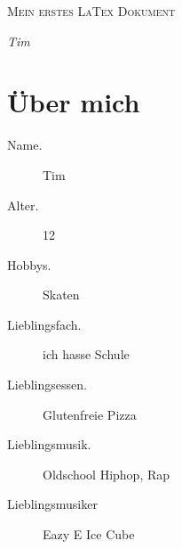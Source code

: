 \documentclass[12pt, a4paper]{article} %
\begin{document}

\thispagestyle{empty}

\begin{title}
	
	\vspace{5cm}
	
	{\scshape\Huge Mein erstes LaTex Dokument \par}

	\vspace{5cm}
	{\Large\itshape Tim \par} %
	

\end{title}

\newpage

\tableofcontents %

\newpage

\section{\"Uber mich}

\begin{description}
\item[Name.]
Tim %
\item[Alter.] 
12 
\item[Hobbys.]
Skaten
\item[Lieblingsfach.]
ich hasse Schule
\item[Lieblingsessen.]
Glutenfreie Pizza
\item[Lieblingsmusik.]
Oldschool Hiphop, Rap 
\item[Lieblingsmusiker] %
Eazy E Ice Cube
\end{description}
\end{document}
